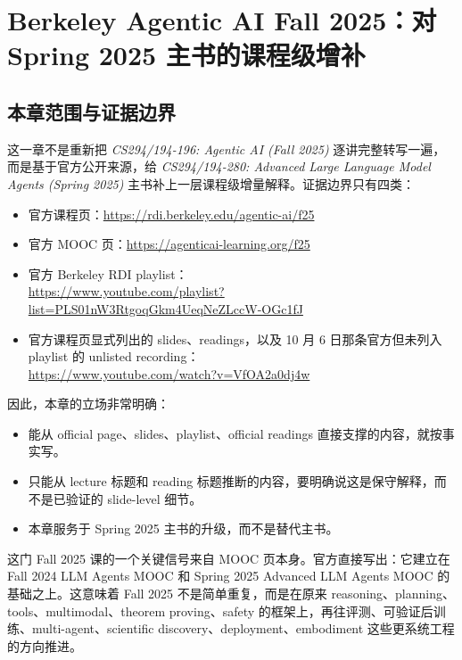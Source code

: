\chapter{Berkeley Agentic AI Fall 2025：对 Spring 2025 主书的课程级增补}
\label{chap:berkeley_agentic_ai_f25_extension}

\section{本章范围与证据边界}

这一章不是重新把 \emph{CS294/194-196: Agentic AI (Fall 2025)} 逐讲完整转写一遍，而是基于官方公开来源，给 \emph{CS294/194-280: Advanced Large Language Model Agents (Spring 2025)} 主书补上一层课程级增量解释。证据边界只有四类：

\begin{itemize}
\item 官方课程页：\url{https://rdi.berkeley.edu/agentic-ai/f25}
\item 官方 MOOC 页：\url{https://agenticai-learning.org/f25}
\item 官方 Berkeley RDI playlist：\\ \url{https://www.youtube.com/playlist?list=PLS01nW3RtgoqGkm4UeqNeZLccW-OGc1fJ}
\item 官方课程页显式列出的 slides、readings，以及 10 月 6 日那条官方但未列入 playlist 的 unlisted recording：\\ \url{https://www.youtube.com/watch?v=VfOA2a0dj4w}
\end{itemize}

因此，本章的立场非常明确：

\begin{itemize}
\item 能从 official page、slides、playlist、official readings 直接支撑的内容，就按事实写。
\item 只能从 lecture 标题和 reading 标题推断的内容，要明确说这是保守解释，而不是已验证的 slide-level 细节。
\item 本章服务于 Spring 2025 主书的升级，而不是替代主书。
\end{itemize}

这门 Fall 2025 课的一个关键信号来自 MOOC 页本身。官方直接写出：它建立在 Fall 2024 LLM Agents MOOC 和 Spring 2025 Advanced LLM Agents MOOC 的基础之上。这意味着 Fall 2025 不是简单重复，而是在原来 reasoning、planning、tools、multimodal、theorem proving、safety 的框架上，再往评测、可验证后训练、multi-agent、scientific discovery、deployment、embodiment 这些更系统工程的方向推进。


